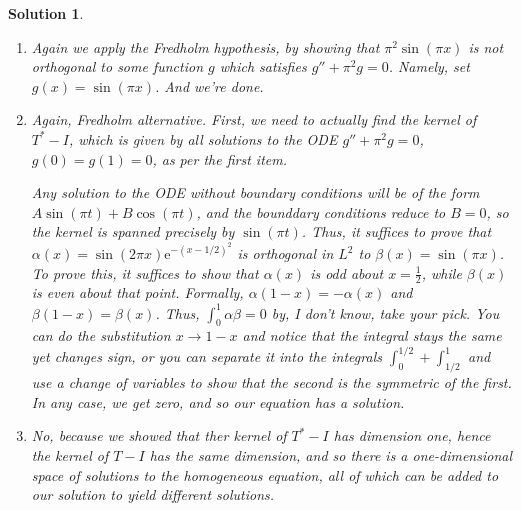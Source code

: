 \documentclass{article}
\theoremstyle{nonumberplain}
\newtheorem{sol}{Solution}
\newcommand{\e}{\mathrm{e}}
\begin{document}
\begin{sol}
\begin{enumerate}
Since $T$ is a Hilbert-Schmidt operator, it is compact. Thus, by the Fredholm alternative, it suffices to show that $\ker(T^* - I)$ to conclude that $T-I$ is invertible. Now, if $g \in \ker(T^* - I)$, by the previous item we get that $g$ is a solution to $g'' - \e^{-x^2} g = 0$ with $g(0) = g(1) = 0$, but we show that this can only happen if $g = 0$, as
\begin{equation}
\begin{aligned}
\int_0^1 \e^{-x^2} g^2(x) \dl3 x &= \int_0^1 g'' g\\
&= \cancel{[g' g]_0^1} - \int_0^1 (g')^2,
\end{aligned}
\end{equation}
and so we have an equality of the form $\int (A^2 + B^2) = 0$, whence both $A$ and $B$ must be null. In particular, $A = \e^{-x^2} g^2(x)$ is null, and so $g$ itself is zero. This concludes the proof.

\item Again we apply the Fredholm hypothesis, by showing that $\pi^2 \sin(\pi x)$ is not orthogonal to some function $g$ which satisfies $g'' + \pi^2 g = 0$. Namely, set $g(x) = \sin(\pi x)$. And we're done.

\item Again, Fredholm alternative. First, we need to actually find the kernel of $T^* - I$, which is given by all solutions to the ODE $g'' + \pi^2 g = 0$, $g(0) = g(1) = 0$, as per the first item.

Any solution to the ODE without boundary conditions will be of the form $A \sin(\pi t) + B \cos(\pi t)$, and the bounddary conditions reduce to $B = 0$, so the  kernel is spanned precisely by $\sin(\pi t)$. Thus, it suffices to prove that $\alpha(x) = \sin(2 \pi x) \e^{-(x-1/2)^2}$ is orthogonal in $L^2$ to $\beta(x) = \sin(\pi x)$. To prove this, it suffices to show that $\alpha(x)$ is odd about $x=\frac12$, while $\beta(x)$ is even about that point. Formally, $\alpha(1-x) = - \alpha(x)$ and $\beta(1-x) = \beta(x)$. Thus, $\int_0^1 \alpha \beta = 0$ by, I don't know, take your pick. You can do the substitution $x \to 1-x$ and notice that the integral stays the same yet changes sign, or you can separate it into the integrals $\int_0^{1/2} + \int_{1/2}^1$ and use a change of variables to show that the second is the symmetric of the first. In any case, we get zero, and so our equation has a solution.

\item No, because we showed that ther kernel of $T^* - I$ has dimension one, hence the kernel of $T-I$ has the same dimension, and so there is a one-dimensional space of solutions to the homogeneous equation, all of which can be added to our solution to yield different solutions.
\end{enumerate}
\end{sol}
\end{document}
